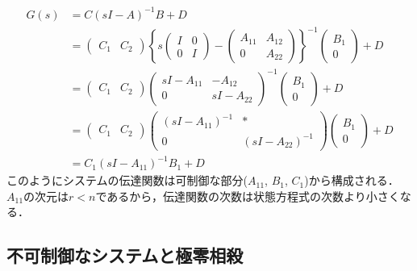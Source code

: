 \begin{align}
	G(s) & = C(sI-A)^{-1}B + D
\nonumber \\
	&= 
		\left(\begin{array}{cc}
			{C}_1 & {C}_2 
		\end{array}\right)
		\left\{ 
			s
			\left(\begin{array}{cc}
				I & 0 \\
				0 & I 
			\end{array}\right)
			-
			\left(\begin{array}{cc}
				{A}_{11} & {A}_{12} \\
				0 & {A}_{22}
			\end{array}\right)
		\right\} ^{-1}
		\left(\begin{array}{c}
			{B}_1 \\
			0
		\end{array}\right)
		+ D
\nonumber \\
	&= 
		\left(\begin{array}{cc}
			{C}_1 & {C}_2 
		\end{array}\right)
		\left(\begin{array}{cc}
			sI - {A}_{11} & - {A}_{12} \\
			0             & sI - {A}_{22}
		\end{array}\right) ^{-1}
		\left(\begin{array}{c}
			{B}_1 \\
			0
		\end{array}\right)
		+ D
\nonumber \\
	&= 
		\left(\begin{array}{cc}
			{C}_1 & {C}_2 
		\end{array}\right)
		\left(\begin{array}{cc}
			(sI - {A}_{11})^{-1} & * \\
			0                    & (sI - {A}_{22})^{-1}
		\end{array}\right) 
		\left(\begin{array}{c}
			{B}_1 \\
			0
		\end{array}\right)
		+ D
\nonumber \\
	&= 
		{C}_1 (sI - {A}_{11})^{-1} {B}_1 + D
\end{align}
このようにシステムの伝達関数は可制御な部分($A_{11}$, $B_1$, $C_1$)から構成される．$A_{11}$の次元は$r < n$であるから，伝達関数の次数は状態方程式の次数より小さくなる．

\subsection{不可制御なシステムと極零相殺}

